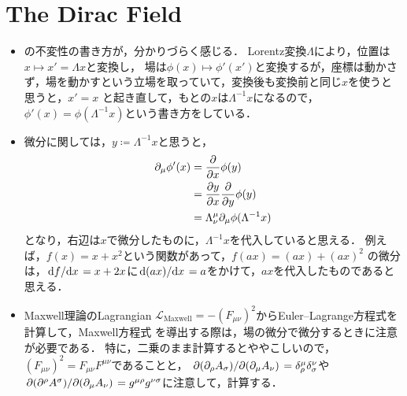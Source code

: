 \section{The Dirac Field}
\begin{itemize}
	\item {}の不変性の書き方が，分かりづらく感じる．
		Lorentz変換$\Lambda$により，位置は$x\mapsto x'= \Lambda x$と変換し，
		場は$\phi(x) \mapsto \phi'(x')$と変換するが，座標は動かさず，場を動かすという立場を取っていて，変換後も変換前と同じ$x$を使うと思うと，$x' = x$
		と起き直して，もとの$x$は$\Lambda^{-1}x$になるので，$\phi'(x)=\phi(\Lambda^{-1}x)$という書き方をしている．

	\item 微分に関しては，$y\coloneqq \Lambda^{-1}x$と思うと，
		\begin{align}
			\partial_{\mu}\phi'(x) &= \pdv{}{x}\phi(y)\\
								   &= \pdv{y}{x}\pdv{}{y}\phi(y)\\
								   &= \Lambda_{\nu}^{\mu}\partial_{\mu}\phi(\Lambda^{-1}x)
		\end{align}
		となり，右辺は$x$で微分したものに，$\Lambda^{-1}x$を代入していると思える．
		例えば，$f(x)= x + x^2$という関数があって，$f(ax) = (ax) + (ax)^2$
		の微分は，$\dv*{f}{x} = x+2x$に$\dv*{(ax)}{x}=a$をかけて，$ax$を代入したものであると思える．

	\item Maxwell理論のLagrangian $\mathcal{L}_{\text{Maxwell}} = -(F_{\mu\nu})^2$からEuler--Lagrange方程式を計算して，Maxwell方程式
		を導出する際は，場の微分で微分するときに注意が必要である．
		特に，二乗のまま計算するとややこしいので，$(F_{\mu\nu})^2=F_{\mu\nu}F^{\mu\nu}$であることと，
		$\pdv*{(\partial_{\rho}A_{\sigma})}{(\partial_{\mu}A_{\nu})} = \delta^{\mu}_{\rho}\delta^{\nu}_{\sigma}$や$\pdv*{(\partial^{\rho}A^{\sigma})}{(\partial_{\mu}A_{\nu})} = g^{\mu\rho}g^{\nu\sigma}$に注意して，計算する．


\end{itemize}
